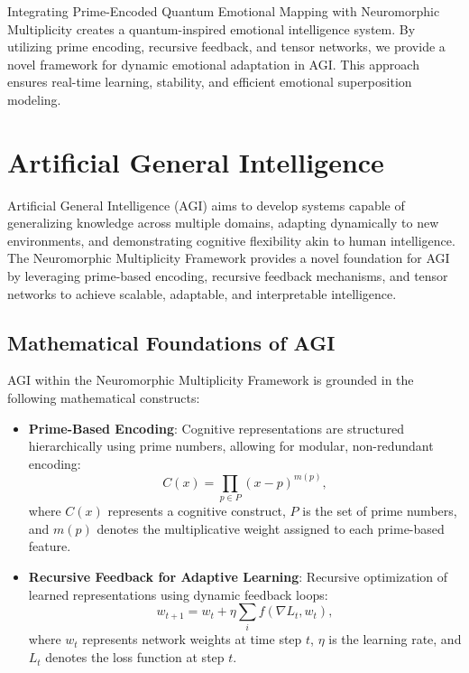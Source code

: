 \documentclass{article}
\theoremstyle{plain}
\begin{document}
\begin{itemize}
\begin{itemize}
Integrating Prime-Encoded Quantum Emotional Mapping with Neuromorphic Multiplicity creates a quantum-inspired emotional intelligence system. By utilizing prime encoding, recursive feedback, and tensor networks, we provide a novel framework for dynamic emotional adaptation in AGI. This approach ensures real-time learning, stability, and efficient emotional superposition modeling.

\section{Artificial General Intelligence}

Artificial General Intelligence (AGI) aims to develop systems capable of generalizing knowledge across multiple domains, adapting dynamically to new environments, and demonstrating cognitive flexibility akin to human intelligence. The Neuromorphic Multiplicity Framework provides a novel foundation for AGI by leveraging prime-based encoding, recursive feedback mechanisms, and tensor networks to achieve scalable, adaptable, and interpretable intelligence.

\subsection{Mathematical Foundations of AGI}
AGI within the Neuromorphic Multiplicity Framework is grounded in the following mathematical constructs:
\begin{itemize}
    \item \textbf{Prime-Based Encoding}: Cognitive representations are structured hierarchically using prime numbers, allowing for modular, non-redundant encoding:
    \begin{equation}
        C(x) = \prod_{p \in P} (x - p)^{m(p)},
    \end{equation}
    where $C(x)$ represents a cognitive construct, $P$ is the set of prime numbers, and $m(p)$ denotes the multiplicative weight assigned to each prime-based feature.

    \item \textbf{Recursive Feedback for Adaptive Learning}: Recursive optimization of learned representations using dynamic feedback loops:
    \begin{equation}
        w_{t+1} = w_t + \eta \sum_{i} f(\nabla L_t, w_t),
    \end{equation}
    where $w_t$ represents network weights at time step $t$, $\eta$ is the learning rate, and $L_t$ denotes the loss function at step $t$.
    

\end{itemize}
\end{itemize}
\end{itemize}
\end{document}
